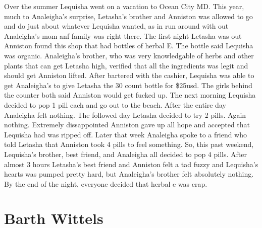 \documentclass[12pt]{book}
\begin{document}
Over the summer Lequisha went on a vacation to Ocean City MD. This year, much to Analeigha's surprise, Letasha's brother and Anniston was allowed to go and do just about whatever Lequisha wanted, as in run around with out Analeigha's mom anf family was right there. The first night Letasha was out Anniston found this shop that had bottles of herbal E. The bottle said Lequisha was organic. Analeigha's brother, who was very knowledgable of herbs and other plants that can get Letasha high, verified that all the ingredients was legit and should get Anniston lifted. After bartered with the cashier, Lequisha was able to get Analeigha's to give Letasha the 30 count bottle for \$25usd. The girls behind the counter both said Anniston would get fucked up. The next morning Lequisha decided to pop 1 pill each and go out to the beach. After the entire day Analeigha felt nothing. The followed day Letasha decided to try 2 pills. Again nothing. Extremely dissappointed Anniston gave up all hope and accepted that Lequisha had was ripped off. Later that week Analeigha spoke to a friend who told Letasha that Anniston took 4 pills to feel something. So, this past weekend, Lequisha's brother, best friend, and Analeigha all decided to pop 4 pills. After almost 3 hours Letasha's best friend and Anniston felt a tad fuzzy and Lequisha's hearts was pumped pretty hard, but Analeigha's brother felt absolutely nothing. By the end of the night, everyone decided that herbal e was crap.



\chapter{Barth Wittels}
\end{document}
